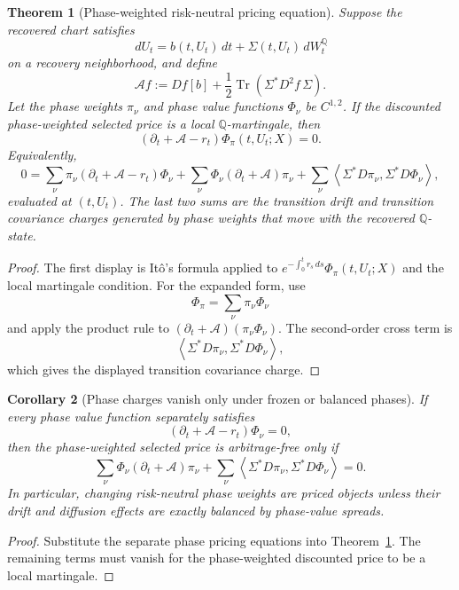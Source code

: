\documentclass[11pt,a4paper]{amsart}
\theoremstyle{plain}
\newtheorem{theorem}{Theorem}[section]
\newtheorem{corollary}[theorem]{Corollary}
\theoremstyle{definition}
\theoremstyle{remark}
\newcommand{\QQ}{\mathbb{Q}}
\newcommand{\cA}{\mathcal{A}}
\newcommand{\dd}{\,d}
\newcommand{\ip}[2]{\left\langle #1,#2\right\rangle}
\begin{document}
\begin{theorem}[Phase-weighted risk-neutral pricing equation]\label{thm:phase-pricing-equation}
Suppose the recovered chart satisfies
\[
        \dd U_t=b(t,U_t)\dd t+\Sigma(t,U_t)\dd W_t^\QQ
\]
on a recovery neighborhood, and define
\[
        \cA f
        :=
        Df[b]
        +
        \frac12\operatorname{Tr}\!\left(\Sigma^\ast D^2f\,\Sigma\right).
\]
Let the phase weights \(\pi_\nu\) and phase value functions \(\Phi_\nu\) be \(C^{1,2}\).  If the
discounted phase-weighted selected price is a local \(\QQ\)-martingale, then
\[
        (\partial_t+\cA-r_t)\Phi_\pi(t,U_t;X)=0 .
\]
Equivalently,
\[
        0
        =
        \sum_\nu
        \pi_\nu(\partial_t+\cA-r_t)\Phi_\nu
        +
        \sum_\nu
        \Phi_\nu(\partial_t+\cA)\pi_\nu
        +
        \sum_\nu
        \ip{\Sigma^\ast D\pi_\nu}{\Sigma^\ast D\Phi_\nu},
\]
evaluated at \((t,U_t)\).  The last two sums are the transition drift and transition covariance
charges generated by phase weights that move with the recovered \(\QQ\)-state.
\end{theorem}

\begin{proof}
The first display is It\^o's formula applied to \(e^{-\int_0^t r_s\dd s}\Phi_\pi(t,U_t;X)\)
and the local martingale condition.  For the expanded form, use
\[
        \Phi_\pi=\sum_\nu\pi_\nu\Phi_\nu
\]
and apply the product rule to \((\partial_t+\cA)(\pi_\nu\Phi_\nu)\).  The second-order cross term
is
\[
        \ip{\Sigma^\ast D\pi_\nu}{\Sigma^\ast D\Phi_\nu},
\]
which gives the displayed transition covariance charge.
\end{proof}

\begin{corollary}[Phase charges vanish only under frozen or balanced phases]\label{cor:phase-charge-balance}
If every phase value function separately satisfies
\[
        (\partial_t+\cA-r_t)\Phi_\nu=0,
\]
then the phase-weighted selected price is arbitrage-free only if
\[
        \sum_\nu
        \Phi_\nu(\partial_t+\cA)\pi_\nu
        +
        \sum_\nu
        \ip{\Sigma^\ast D\pi_\nu}{\Sigma^\ast D\Phi_\nu}
        =
        0 .
\]
In particular, changing risk-neutral phase weights are priced objects unless their drift and
diffusion effects are exactly balanced by phase-value spreads.
\end{corollary}

\begin{proof}
Substitute the separate phase pricing equations into
Theorem~\ref{thm:phase-pricing-equation}.  The remaining terms must vanish for the
phase-weighted discounted price to be a local martingale.
\end{proof}
\end{document}
